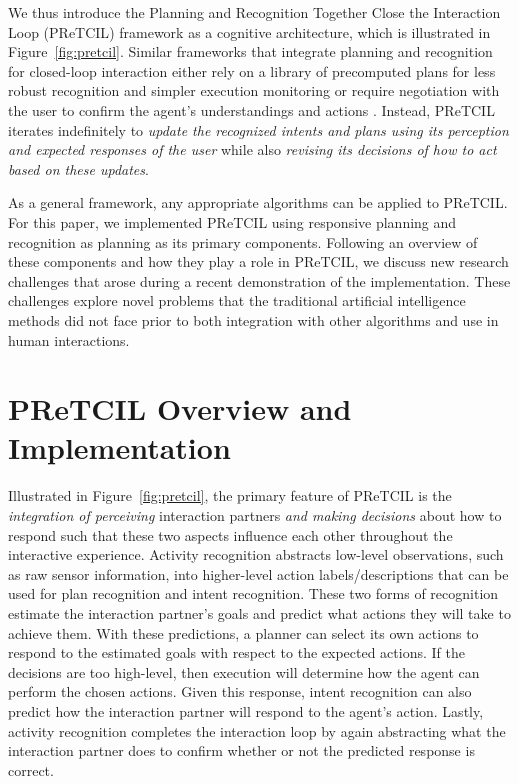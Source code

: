 \documentclass[letterpaper]{article} %
\begin{document}
We thus introduce the Planning and Recognition Together Close the Interaction Loop ({\sc PReTCIL}) framework as a cognitive architecture, which is illustrated in Figure~\ref{fig:pretcil}.  Similar frameworks that integrate planning and recognition for closed-loop interaction either rely on a library of precomputed plans for less robust recognition and simpler execution monitoring \cite{levine_ICAPS147945,jair_levineWilliams}
or require negotiation with the user to confirm the agent's understandings and actions \cite{geibPetrick_2016}.  Instead, {\sc PReTCIL} iterates indefinitely to \textit{update the recognized intents and plans using its perception and expected responses of the user} while also \textit{revising its decisions of how to act based on these updates}.

As a general framework, any appropriate algorithms can be applied to {\sc PReTCIL}.  For this paper, we implemented {\sc PReTCIL} using responsive planning \cite{fz_aaai2017} and recognition as planning \cite{DBLP:conf/aaai/RamirezG10} as its primary components.  Following an overview of these components and how they play a role in {\sc PReTCIL}, we discuss new research challenges that arose during a recent demonstration of the implementation.  These challenges explore novel problems that the traditional artificial intelligence methods did not face prior to both integration with other algorithms and use in human interactions.

\section{{\sc PReTCIL} Overview and Implementation\label{sec:pretcil}}
Illustrated in Figure~\ref{fig:pretcil}, the primary feature of {\sc PReTCIL} is the \textit{integration of perceiving} interaction partners \textit{and making decisions} about how to respond such that these two aspects influence each other throughout the interactive experience.  Activity recognition abstracts low-level observations, such as raw sensor information, into higher-level action labels/descriptions that can be used for plan recognition and intent recognition.  These two forms of recognition estimate the interaction partner's goals and predict what actions they will take to achieve them.  With these predictions, a planner can select its own actions to respond to the estimated goals with respect to the expected actions.  If the decisions are too high-level, then execution will determine how the agent can perform the chosen actions.  Given this response, intent recognition can also predict how the interaction partner will respond to the agent's action.  Lastly, activity recognition completes the interaction loop by again abstracting what the interaction partner does to confirm whether or not the predicted response is correct.
\end{document}

